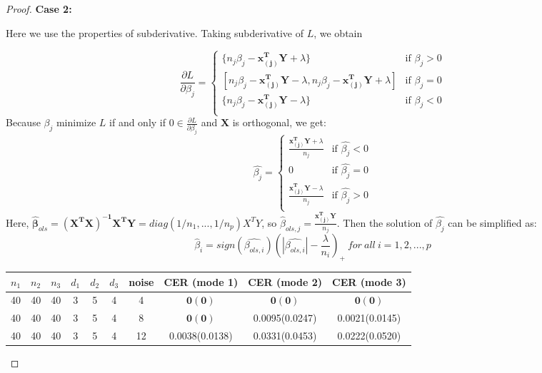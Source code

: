\documentclass{article}
\newtheorem{proof}{Proof}
\begin{document}
\begin{appendices}
\begin{proof}
\textbf{Case 2:}\par
Here we use the properties of subderivative. Taking subderivative of $L$, we obtain
	
\begin{equation*}
\frac{\partial L}{\partial \beta_j} = 
\begin{cases}
\{n_j\beta_j-\mathbf{x_{(j)}^TY}+\lambda\} &\mbox{if $\beta_j>0$}\\
 [n_j\beta_j-\mathbf{x_{(j)}^TY}-\lambda, n_j\beta_j-\mathbf{x_{(j)}^TY}+\lambda]&\mbox{if $\beta_j=0$}\\
\{n_j\beta_j-\mathbf{x_{(j)}^TY}-\lambda\} &\mbox{if $\beta_j<0$}\\
\end{cases}
\end{equation*}
Because $\beta_j$ minimize $L$ if and only if $0 \in \frac{\partial L}{\partial \beta_j}$ and  $\mathbf{X}$ is orthogonal, we get:
\begin{equation*}
\hat{\beta_j} = 
\begin{cases}
\frac{\mathbf{x_{(j)}^TY}+\lambda}{n_j}&\mbox{if $\hat{\beta_j}<0$}\\
0 &\mbox{if $\hat{\beta_j}=0$}\\
\frac{\mathbf{x_{(j)}^TY}-\lambda}{n_j}&\mbox{if $\hat{\beta_j}>0$}\\
\end{cases}
\end{equation*}
Here, $\bm{\hat{\beta}}_{ols} = \mathbf{(X^TX)^{-1}X^TY} = diag(1/n_1, ..., 1/n_p)X^TY$, so $\hat{\beta}_{ols,j}=\frac{\mathbf{x_{(j)}^TY}}{n_j}$. Then the solution of $\hat{\beta_j}$ can be simplified as:
\begin{equation*}
	\hat{\beta}_i = sign(\hat{\beta_{ols,i}})(|\hat{\beta_{ols,i}}|-\frac{\lambda}{n_i})_+\ for\ all\ i=1,2,...,p
\end{equation*}



\begin{table}[http]
	\centering
	\begin{tabular}{|c|c|c|c|c|c|c|c|c|c|}
		\hline
		$n_1$&$n_2$&$n_3$&$d_1$&$d_2$&$d_3$&noise&CER (mode 1)&CER (mode 2)&CER (mode 3)\\ \hline
		40&40&40&3&5&4&4&
		$\mathbf{0(0)}$&$\mathbf{0(0)}$&$\mathbf{0(0)}$\\
		40&40&40&3&5&4&8&$\mathbf{0(0)}$&0.0095(0.0247)&0.0021(0.0145) \\
		40&40&40&3&5&4&12&0.0038(0.0138)&0.0331(0.0453)&0.0222(0.0520)\\


\end{tabular}
\end{table}
\end{proof}
\end{appendices}
\end{document}
